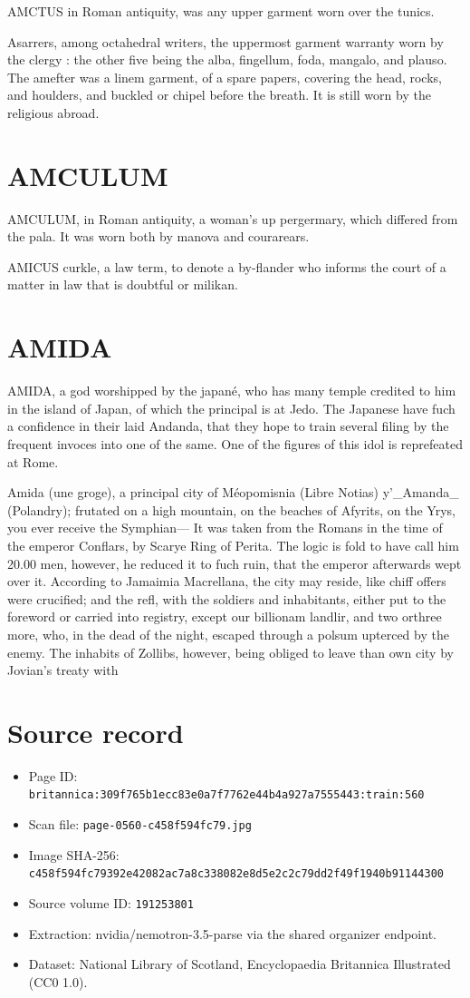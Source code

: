 \documentclass{article}
\begin{document}
AMCTUS in Roman antiquity, was any upper garment worn over the tunics.

Asarrers, among octahedral writers, the uppermost garment warranty worn by the clergy : the other five being the alba, fingellum, foda, mangalo, and plauso. The amefter was a linem garment, of a spare papers, covering the head, rocks, and houlders, and buckled or chipel before the breath. It is still worn by the religious abroad.

\section*{AMCULUM}
AMCULUM, in Roman antiquity, a woman’s up pergermary, which differed from the pala. It was worn both by manova and courarears.

AMICUS curkle, a law term, to denote a by-flander who informs the court of a matter in law that is doubtful or milikan.

\section*{AMIDA}
AMIDA, a god worshipped by the japané, who has many temple credited to him in the island of Japan, of which the principal is at Jedo. The Japanese have fuch a confidence in their laid Andanda, that they hope to train several filing by the frequent invoces into one of the same. One of the figures of this idol is reprefeated at Rome.

Amida (une groge), a principal city of Méopomisnia (Libre Notias) y'\_Amanda\_ (Polandry); frutated on a high mountain, on the beaches of Afyrits, on the Yrys, you ever receive the Symphian— It was taken from the Romans in the time of the emperor Conflars, by Scarye Ring of Perita. The logic is fold to have call him 20.00 men, however, he reduced it to fuch ruin, that the emperor afterwards wept over it. According to Jamaimia Macrellana, the city may reside, like chiff offers were crucified; and the refl, with the soldiers and inhabitants, either put to the foreword or carried into registry, except our billionam landlir, and two orthree more, who, in the dead of the night, escaped through a polsum upterced by the enemy. The inhabits of Zollibs, however, being obliged to leave than own city by Jovian’s treaty with

\section*{Source record}
\begin{itemize}
\item Page ID: \texttt{britannica:309f765b1ecc83e0a7f7762e44b4a927a7555443:train:560}
\item Scan file: \texttt{page-0560-c458f594fc79.jpg}
\item Image SHA-256: \texttt{c458f594fc79392e42082ac7a8c338082e8d5e2c2c79dd2f49f1940b91144300}
\item Source volume ID: \texttt{191253801}
\item Extraction: nvidia/nemotron-3.5-parse via the shared organizer endpoint.
\item Dataset: National Library of Scotland, Encyclopaedia Britannica Illustrated (CC0 1.0).
\end{itemize}
\end{document}
